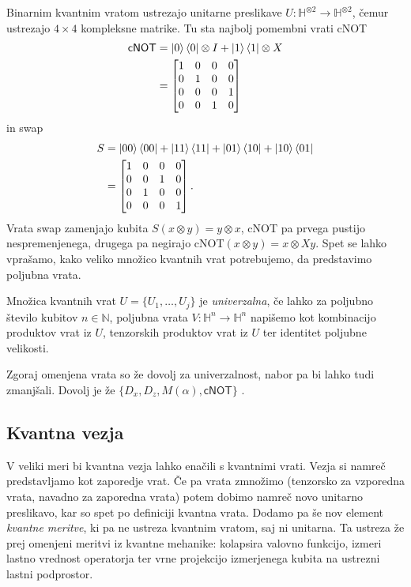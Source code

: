 \documentclass[mat1]{fmfdelo}
\newcommand{\N}{\mathbb N}
\newcommand{\Hb}{\mathbb H}
\begin{document}
Binarnim kvantnim vratom ustrezajo unitarne preslikave \(U:\Hb^{\otimes 2}\to \Hb^{\otimes 2}\), čemur ustrezajo \(4\times 4\) kompleksne matrike. Tu sta najbolj pomembni vrati \textsf{cNOT} 
\begin{align*}
    \mathsf{cNOT}&=\ket0\bra0\otimes I + \ket1\bra1\otimes X \\
    &=\begin{bmatrix}
        1&0&0&0\\
        0&1&0&0\\
        0&0&0&1\\
        0&0&1&0
    \end{bmatrix}
\end{align*}
in \textsf{swap}
\begin{align*}
    S &= \ket{00}\bra{00}+\ket{11}\bra{11}+\ket{01}\bra{10}+\ket{10}\bra{01}\\
    &=\begin{bmatrix}
        1&0&0&0\\
        0&0&1&0\\
        0&1&0&0\\
        0&0&0&1
    \end{bmatrix}.
\end{align*}
Vrata \textsf{swap} zamenjajo kubita \(S(x\otimes y)=y\otimes x\), \textsf{cNOT} pa prvega pustijo nespremenjenega, drugega pa negirajo \textsf{cNOT}\((x\otimes y)=x\otimes Xy\). Spet se lahko vprašamo, kako veliko množico kvantnih vrat potrebujemo, da predstavimo poljubna vrata.
\begin{definicija}
    Množica kvantnih vrat \(U=\{U_1,\ldots,U_j\}\) je \emph{univerzalna}, če lahko za poljubno število kubitov \(n\in\N\), poljubna vrata \(V:\Hb^n\to \Hb^n\) napišemo kot kombinacijo produktov vrat iz \(U\), tenzorskih produktov vrat iz \(U\) ter identitet poljubne velikosti.
\end{definicija}
Zgoraj omenjena vrata so že dovolj za univerzalnost, nabor pa bi lahko tudi zmanjšali. Dovolj je že \(\{D_x,D_z, M(\alpha), \mathsf{cNOT}\}\) \cite[Lema 5.26]{mathforqm}.
\subsection{Kvantna vezja}
V veliki meri bi kvantna vezja lahko enačili s kvantnimi vrati. Vezja si namreč predstavljamo kot zaporedje vrat. Če pa vrata zmnožimo (tenzorsko za vzporedna vrata, navadno za zaporedna vrata) potem dobimo namreč novo unitarno preslikavo, kar so spet po definiciji kvantna vrata. Dodamo pa še nov element \emph{kvantne meritve}, ki pa ne ustreza kvantnim vratom, saj ni unitarna. Ta ustreza že prej omenjeni meritvi iz kvantne mehanike: kolapsira valovno funkcijo, izmeri lastno vrednost operatorja ter vrne projekcijo izmerjenega kubita na ustrezni lastni podprostor.
\end{document}

